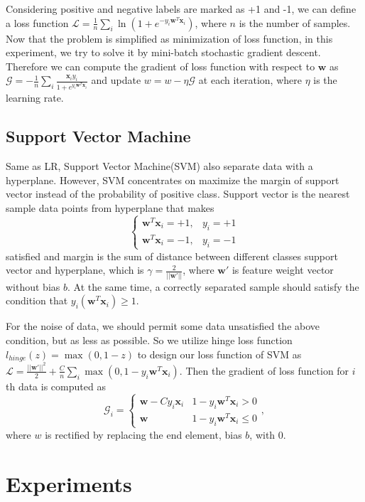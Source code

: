 \documentclass[journal, a4paper]{IEEEtran}
\begin{document}
Considering positive and negative labels are marked as +1 and -1, we can define a loss function $\mathcal{L} = \frac{1}{n}\sum_i\ln{(1+e^{-y_i\bm{w}^T\bm{x}_i})}$, where $n$ is the number of samples.
Now that the problem is simplified as minimization of loss function, in this experiment, we try to solve it by mini-batch stochastic gradient descent.
Therefore we can compute the gradient of loss function with respect to $\bm{w}$ as $\mathcal{G}=-\frac{1}{n}\sum_i{\frac{\bm{x}_iy_i}{1+e^{y_i\bm{w}^T\bm{x}_i}}}$ and update $w=w-\eta\mathcal{G}$ at each iteration, where $\eta$ is the learning rate.
\subsection{Support Vector Machine}
Same as LR, Support Vector Machine(SVM) also separate data with a hyperplane.
However, SVM concentrates on maximize the margin of support vector instead of the probability of positive class.
Support vector is the nearest sample data points from hyperplane that makes
\[
\left\{
\begin{array}{cc}
        \bm{w}^T\bm{x}_i=+1, & y_i=+1 \\
        \bm{w}^T\bm{x}_i=-1, & y_i=-1
      \end{array}
\right.
\]
satisfied and margin is the sum of distance between different classes support vector and hyperplane, which is $\gamma=\frac{2}{||\bm{w}'||}$, where $\bm{w}'$ is feature weight vector without bias $b$.
At the same time, a correctly separated sample should satisfy the condition that $y_i(\bm{w}^T\bm{x}_i)\geqslant1$.

For the noise of data, we should permit some data unsatisfied the above condition, but as less as possible.
So we utilize hinge loss function $l_{hinge}(z)=\max{(0,1-z)}$ to design our loss function of SVM as $\mathcal{L}=\frac{||\bm{w}'||^2}{2}+\frac{C}{n}\sum_i{\max{(0,1-y_i\bm{w}^T\bm{x}_i)}}$.
Then the gradient of loss function for $i$ th data is computed as
\[
\mathcal{G}_i=
\left\{
\begin{array}{cc}
  \bm{w}-Cy_i\bm{x}_i & 1-y_i\bm{w}^T\bm{x}_i>0 \\
  \bm{w} & 1-y_i\bm{w}^T\bm{x}_i\leqslant0
\end{array}
\right.,
\]
where $w$ is rectified by replacing the end element, bias $b$, with 0.

\section{Experiments}
\end{document}
